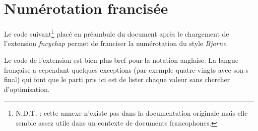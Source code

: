 \documentclass{report}
\begin{document}
  \appendix
  \chapter{Numérotation francisée} \label{french}

    Le code suivant\footnote{N.D.T. : cette annexe n'existe pas dans la 
    documentation originale mais elle semble assez utile dans un contexte de 
    documents francophones.} placé en préambule du document après le chargement
    de l'extension \textsl{fncychap} permet de franciser la numérotation du
    style \emph{Bjarne}. 

    Le code de l'extension est bien plus bref pour la notation anglaise. La
    langue française a cependant quelques exceptions (par exemple 
    \og quatre-vingts \fg{} avec son \og s \fg{} final) qui font que le
    parti pris ici est de lister chaque valeur sans chercher d'optimisation.
\end{document}
